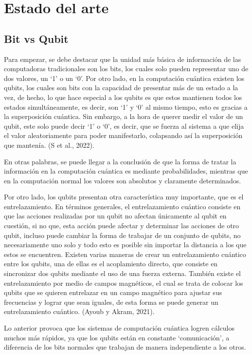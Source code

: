 \documentclass{article}
\begin{document}
\newpage
\section{Estado del arte}

\subsection{Bit vs Qubit}
Para empezar, se debe destacar que la unidad más básica de información de las computadoras tradicionales son los bits, los cuales solo pueden representar uno de dos valores, un ‘1’ o un ‘0’. Por otro lado, en la computación cuántica existen los qubits, los cuales son bits con la capacidad de presentar más de un estado a la vez, de hecho, lo que hace especial a los qubits es que estos mantienen todos los estados simultáneamente, es decir, son ‘1’ y ‘0’ al mismo tiempo, esto es gracias a la superposición cuántica. Sin embargo, a la hora de querer medir el valor de un qubit, este solo puede decir ‘1’ o ‘0’, es decir, que se fuerza al sistema a que elija el valor aleatoriamente para poder manifestarlo, colapsando así la superposición que mantenía. (S et al., 2022).

En otras palabras, se puede llegar a la conclusión de que la forma de tratar la información en la computación cuántica es mediante probabilidades, mientras que en la computación normal los valores son absolutos y claramente determinados.

Por otro lado, los qubits presentan otra característica muy importante, que es el entrelazamiento. En términos generales, el entrelazamiento cuántico consiste en que las acciones realizadas por un qubit no afectan únicamente al qubit en cuestión, si no que, esta acción puede afectar y determinar las acciones de otro qubit, incluso puede cambiar la forma de trabajar de un conjunto de qubits, no necesariamente uno solo y todo esto es posible sin importar la distancia a los que estos se encuentren. 
Existen varias maneras de crear un entrelazamiento cuántico entre los qubits, una de ellas es el acoplamiento directo, que consiste en sincronizar dos qubits mediante el uso de una fuerza externa. También existe el entrelazamiento por medio de campos magnéticos, el cual se trata de colocar los qubits que se quieren entrelazar en un campo magnético para ajustar sus frecuencias y lograr que sean iguales, de esta forma se puede generar un entrelazamiento cuántico. (Ayoub y Akram, 2021).

Lo anterior provoca que los sistemas de computación cuántica logren cálculos muchos más rápidos, ya que los qubits están en constante ‘comunicación’, a diferencia de los bits normales que trabajan de manera independiente a los otros. 
\end{document}

